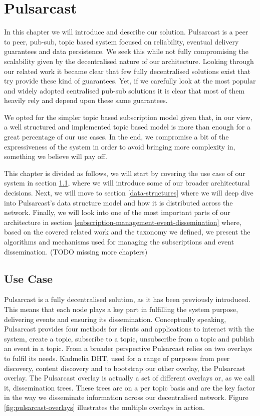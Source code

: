 
\chapter{Pulsarcast}
\label{chapter:pulsarcast}

In this chapter we will introduce and describe our solution. Pulsarcast is a
peer to peer, pub-sub, topic based system focused on reliability, eventual
delivery guarantees and data persistence. We seek this while not fully
compromising the scalability given by the decentralised nature of our
architecture. Looking through our related work it became clear that few fully
decentralised solutions exist that try provide these kind of guarantees. Yet,
if we carefully look at the most popular and widely adopted centralised pub-sub
solutions it is clear that most of them heavily rely and depend upon these same
guarantees. 

We opted for the simpler topic based subscription model given that, in our
view, a well structured and implemented topic based model is more than enough
for a great percentage of our use cases. In the end, we compromise a bit of the
expressiveness of the system in order to avoid bringing more complexity in,
something we believe will pay off.

This chapter is divided as follows, we will start by covering the use case of
our system in section \ref{use-case}, where we will introduce some of our
broader architectural decisions. Next, we will move to section
\ref{data-structures} where we will deep dive into Pulsarcast's data structure
model and how it is distributed across the network. Finally, we will look into
one of the most important parts of our architecture in section
\ref{subscription-management-event-dissemination} where, based on the covered
related work and the taxonomy we defined, we present the algorithms and
mechanisms used for managing the subscriptions and event dissemination. (TODO missing more chapters)

\section{Use Case}\label{use-case}

Pulsarcast is a fully decentralised solution, as it has been previously
introduced. This means that each node plays a key part in fulfilling the system
purpose, delivering events and ensuring its dissemination. Conceptually
speaking, Pulsarcast provides four methods for clients and applications to
interact with the system, create a topic, subscribe to a topic, unsubscribe
from a topic and publish an event in a topic. From a broader perspective
Pulsarcast relies on two overlays to fulfil its needs. Kadmelia DHT, used for a
range of purposes from peer discovery, content discovery and to bootstrap our
other overlay, the Pulsarcast overlay. The Pulsarcast overlay is actually a set
of different overlays or, as we call it, dissemination trees.  These trees are
on a per topic basis and are the key factor in the way we disseminate
information across our decentralised network. Figure
\ref{fig:pulsarcast-overlays} illustrates the multiple overlays in action.

